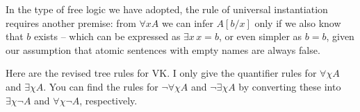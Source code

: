 In the type of free logic we have adopted, the rule of universal instantiation
requires another premise: from $\forall x A$ we can infer $A[b/x]$ only if we
also know that $b$ exists -- which can be expressed as $\exists x \, x\!=\!b$, or
even simpler as $b\!=\!b$, given our assumption that atomic sentences with empty
names are always false.

Here are the revised tree rules for VK. I only give the quantifier rules for
$\forall \chi A$ and $\exists \chi A$. You can find the rules for
$\neg \forall \chi A$ and $\neg\exists \chi A$ by converting these into
$\exists \chi \neg A$ and $\forall \chi \neg A$, respectively.

\bigskip

\begin{minipage}{0.6\textwidth} \centering
{}
\end{minipage}
\begin{minipage}{0.4\textwidth}\centering
{}
\end{minipage}



